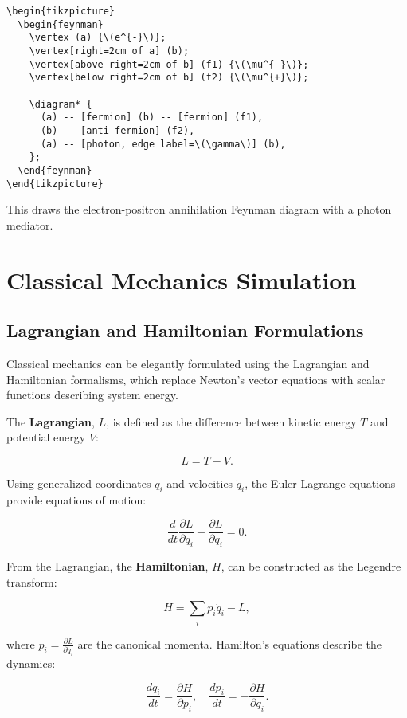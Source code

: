 \documentclass[12pt]{book}
\begin{document}
\begin{verbatim}
\begin{tikzpicture}
  \begin{feynman}
    \vertex (a) {\(e^{-}\)};
    \vertex[right=2cm of a] (b);
    \vertex[above right=2cm of b] (f1) {\(\mu^{-}\)};
    \vertex[below right=2cm of b] (f2) {\(\mu^{+}\)};

    \diagram* {
      (a) -- [fermion] (b) -- [fermion] (f1),
      (b) -- [anti fermion] (f2),
      (a) -- [photon, edge label=\(\gamma\)] (b),
    };
  \end{feynman}
\end{tikzpicture}
\end{verbatim}

This draws the electron-positron annihilation Feynman diagram with a photon mediator.

\chapter{Classical Mechanics Simulation}

\section{Lagrangian and Hamiltonian Formulations}

Classical mechanics can be elegantly formulated using the Lagrangian and Hamiltonian formalisms, which replace Newton's vector equations with scalar functions describing system energy.

The \textbf{Lagrangian}, \(L\), is defined as the difference between kinetic energy \(T\) and potential energy \(V\):

\[
L = T - V.
\]

Using generalized coordinates \(q_i\) and velocities \(\dot{q}_i\), the Euler-Lagrange equations provide equations of motion:

\[
\frac{d}{dt} \frac{\partial L}{\partial \dot{q}_i} - \frac{\partial L}{\partial q_i} = 0.
\]

From the Lagrangian, the \textbf{Hamiltonian}, \(H\), can be constructed as the Legendre transform:

\[
H = \sum_i p_i \dot{q}_i - L,
\]

where \(p_i = \frac{\partial L}{\partial \dot{q}_i}\) are the canonical momenta. Hamilton's equations describe the dynamics:

\[
\frac{d q_i}{dt} = \frac{\partial H}{\partial p_i}, \quad
\frac{d p_i}{dt} = -\frac{\partial H}{\partial q_i}.
\]
\end{document}
